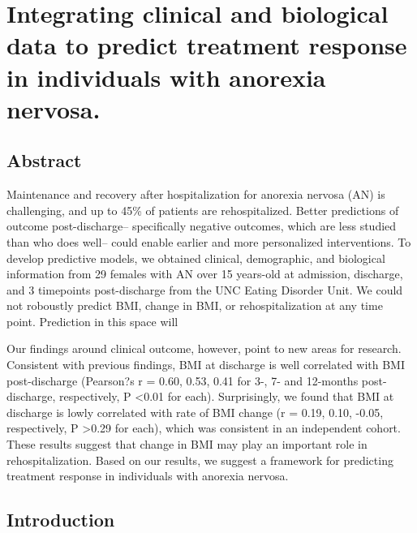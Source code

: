 \chapter{Integrating clinical and biological data to predict treatment response in individuals with anorexia nervosa.}\label{ch:singleCellSeq}

\section[Abstract]{Abstract\footnotemark}

Maintenance and recovery after hospitalization for anorexia nervosa (AN) is challenging, and up to 45\% of patients are rehospitalized. Better predictions of outcome post-discharge-- specifically negative outcomes, which are less studied than who does well-- could enable earlier and more personalized interventions. To develop predictive models, we obtained clinical, demographic, and biological information from 29 females with AN over 15 years-old at admission, discharge, and 3 timepoints post-discharge from the UNC Eating Disorder Unit. We could not roboustly predict BMI, change in BMI, or rehospitalization at any time point. Prediction in this space will

Our findings around clinical outcome, however, point to new areas for research. Consistent with previous findings, BMI at discharge is well correlated with BMI post-discharge (Pearson?s r = 0.60, 0.53, 0.41 for 3-, 7- and 12-months post-discharge, respectively, P \textless 0.01 for each). Surprisingly, we found that BMI at discharge is lowly correlated with rate of BMI change (r = 0.19, 0.10, -0.05, respectively, P \textgreater 0.29 for each), which was consistent in an independent cohort. These results suggest that change in BMI may play an important role in rehospitalization. Based on our results, we suggest a framework for predicting treatment response in individuals with anorexia nervosa.


\section{Introduction}\label{ch04-introduction}

